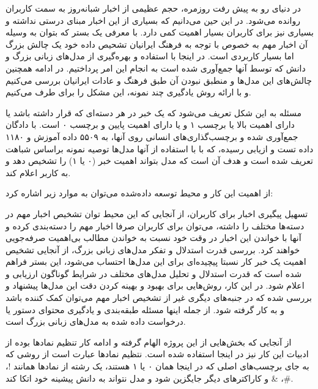 

در دنیای رو به پیش رفت روزمره، حجم عظیمی از اخبار شبانه‌روز به سمت کاربران روانده می‌شود. در این حین می‌دانیم که بسیاری از این اخبار مبنای درستی نداشته و بسیاری نیز برای کاربران بسیار اهمیت کمی دارد. با معرفی یک بستر که بتوان به وسیله آن اخبار مهم به خصوص با توجه به فرهنگ ایرانیان تشحیص داده خود یک چالش بزرگ اما بسیار کاربردی است. در اینجا با استفاده و بهره‌گیری از مدل‌های زبانی بزرگ و دانش که توسط آنها جمع‌آوری شده است به انجام این امر پرداختیم. در ادامه همچنین چالش‌های این مدل‌ها و منطبق نبودن آن طبق فرهنگ و عادات ایرانیان بررسی می‌کنیم و با ارائه روش یادگیری چند نمونه، این مشکل را برای طرف می‌کنیم.


مسئله به این شکل تعریف می‌شود که یک خبر در هر دسته‌ای که قرار داشته باشد یا دارای اهمیت بالا یا برچسب ۱ و یا دارای اهمیت پایین و برچسب ۰ است. با دادگان جمع‌‌آوری شده و برچسب‌گذاری‌های انسانی روی آنها، به ۵۵۰۹ داده آموزش و ۱۱۸۰ داده تست و ازیابی رسیده، که با با استفاده از آنها مدل‌ها توصیه نمونه براساس شباهت تعریف شده است و هدف آن است که مدل بتواند اهمیت خبر (۰ یا ۱) را تشخیص دهد و به کاربر اعلام کند.


از اهمیت این کار و محیط توسعه داده‌شده می‌توان به موارد زیر اشاره کرد:

تسهیل پیگیری اخبار برای کاربران، از آنجایی که این محیط توان تشخیص اخبار مهم در دسته‌ها مختلف را داشته، می‌توان برای کاربران صرفا اخبار مهم را دسته‌بندی کرده و آنها با خواندن این اخبار در وقت خود نسبت به خواندن مطالب بی‌اهمیت صرفه‌جویی خواهند کرد.
بررسی قدرت استدلال و تفکر مدل‌های زبانی بزرگ، از آنجایی تشخیص اهمیت یک خبر کار نسبتا پیچیده‌ای برای این مدل‌ها احتساب می‌شود، این بستر فراهم شده است که قدرت استدلال و تحلیل مدل‌های مختلف در شرایط گوناگون ارزیابی و اعلام شود.
در این کار، روش‌هایی برای بهبود و بهینه کردن دقت این مدل‌ها پیشنهاد و بررسی شده که در جنبه‌های دیگری غیر از تشخیص اخبار مهم می‌توان کمک کننده باشد و به کار گرفته شود. از جمله اینها مسئله طبقه‌بندی و یادگیری محتوای دستور یا درخواست داده شده به مدل‌های زبانی بزرگ است.

از آنجایی که بخش‌هایی از این پروژه الهام گرفته و ادامه کار تنظیم نمادها
بوده از ادبیات این کار نیز در اینجا استفاده شده است. نتظیم نمادها عبارت است از روشی که به جای برچسب‌های اصلی که در اینجا همان ۰ یا ۱ هستند، یک رشته‌ از نماد‌ها همانند !، \#، \& و کاراکترهای دیگر جایگزین شود و مدل نتواند به دانش پیشینه خود اتکا کند.


